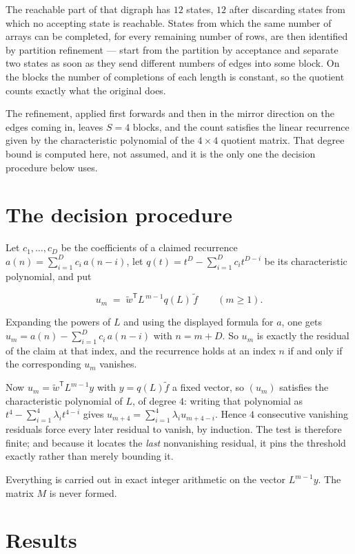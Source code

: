 \documentclass[11pt]{article}
\theoremstyle{definition}
\begin{document}
The reachable part of that digraph has $12$ states, $12$ after discarding states from which no accepting state is reachable. States from which the same number of arrays can be completed, for every remaining number of rows, are then identified by partition refinement --- start from the partition by acceptance and separate two states as soon as they send different numbers of edges into some block. On the blocks the number of completions of each length is constant, so the quotient counts exactly what the original does.

The refinement, applied first forwards and then in the mirror direction on the edges coming in, leaves $S = 4$ blocks, and the count satisfies the linear recurrence given by the characteristic polynomial of the $4 \times 4$ quotient matrix. That degree bound is computed here, not assumed, and it is the only one the decision procedure below uses.

\section{The decision procedure}

Let $c_1,\dots,c_D$ be the coefficients of a claimed recurrence $a(n) = \sum_{i=1}^{D} c_i\,a(n-i)$, let $q(t) = t^{D} - \sum_{i=1}^{D} c_i t^{D-i}$ be its characteristic polynomial, and put

\[u_m \;=\; \tilde w^{\mathsf T} L^{\,m-1} q(L)\,\tilde f \qquad (m \ge 1).\]

Expanding the powers of $L$ and using the displayed formula for $a$, one gets $u_m = a(n) - \sum_{i=1}^{D} c_i\,a(n-i)$ with $n = m + D$. So $u_m$ is exactly the residual of the claim at that index, and the recurrence holds at an index $n$ if and only if the corresponding $u_m$ vanishes.

Now $u_m = \tilde w^{\mathsf T} L^{m-1} y$ with $y = q(L)\tilde f$ a fixed vector, so $(u_m)$ satisfies the characteristic polynomial of $L$, of degree $4$: writing that polynomial as $t^{4} - \sum_{i=1}^{4} \lambda_i t^{4-i}$ gives $u_{m+4} = \sum_{i=1}^{4} \lambda_i u_{m+4-i}$. Hence $4$ consecutive vanishing residuals force every later residual to vanish, by induction. The test is therefore finite; and because it locates the {\itshape last} nonvanishing residual, it pins the threshold exactly rather than merely bounding it.

Everything is carried out in exact integer arithmetic on the vector $L^{m-1}y$. The matrix $M$ is never formed.

\section{Results}
\end{document}
